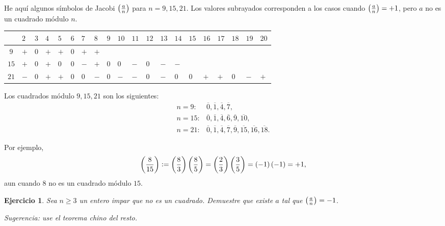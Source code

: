 \documentclass{article}
\theoremstyle{plain}
\newtheorem{ejerc}{Ejercicio}
\begin{document}
\begin{ejemplo}
  He aquí algunos símbolos de Jacobi $\left(\frac{a}{n}\right)$ para $n = 9, 15, 21$.
  Los valores subrayados corresponden a los casos cuando $\left(\frac{a}{n}\right) = +1$,
  pero $a$ no es un cuadrado módulo $n$.

{\small
\begin{center}
\begin{tabular}{|c|f{0.35cm}|f{0.35cm}|f{0.35cm}|f{0.35cm}|f{0.35cm}|f{0.35cm}|f{0.35cm}|f{0.35cm}|f{0.35cm}|f{0.35cm}|f{0.35cm}|f{0.35cm}|f{0.35cm}|f{0.35cm}|f{0.35cm}|f{0.35cm}|f{0.35cm}|f{0.35cm}|f{0.35cm}|}
\hline
{} & $2$ & $3$ & $4$ & $5$ & $6$ & $7$ & $8$ & $9$ & $10$ & $11$ & $12$ & $13$ & $14$ & $15$ & $16$ & $17$ & $18$ & $19$ & $20$ \tabularnewline
\hline
$9$ & $+$ & $0$ & $+$ & $+$ & $0$ & $+$ & $+$ &  &  &  &  &  &  &  &  &  &  &  &  \tabularnewline
\hline
$15$ & $+$ & $0$ & $+$ & $0$ & $0$ & $-$ & $+$ & $0$ & $0$ & $-$ & $0$ & $-$ & $-$ &  &  &  &  &  & \tabularnewline
\hline
$21$ & $-$ & $0$ & $+$ & $+$ & $0$ & $0$ & $-$ & $0$ & $-$ & $-$ & $0$ & $-$ & $0$ & $0$ & $+$ & $+$ & $0$ & $-$ & $+$ \tabularnewline
\hline
\end{tabular}
\end{center}}

  Los cuadrados módulo $9, 15, 21$ son los siguientes:
  \begin{align*}
    n=9\colon & \overline{0}, \overline{1}, \overline{4}, \overline{7},\\
    n=15\colon & \overline{0}, \overline{1}, \overline{4}, \overline{6}, \overline{9}, \overline{10},\\
    n=21\colon & \overline{0}, \overline{1}, \overline{4}, \overline{7}, \overline{9}, \overline{15}, \overline{16}, \overline{18}.
  \end{align*}

  Por ejemplo,
  $$\left(\frac{8}{15}\right) \mathrel{\mathop:}= \left(\frac{8}{3}\right)\left(\frac{8}{5}\right) = \left(\frac{2}{3}\right)\left(\frac{3}{5}\right) = (-1)\,(-1) = +1,$$
  aun cuando $8$ no es un cuadrado módulo $15$.
\end{ejemplo}

\begin{ejerc}
  Sea $n \ge 3$ un entero impar que no es un cuadrado. Demuestre que existe $a$
  tal que $\left(\frac{a}{n}\right) = -1$.

  \noindent Sugerencia: use el teorema chino del resto.
\end{ejerc}
\end{document}
